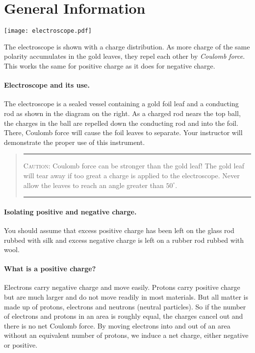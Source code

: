 \section{General Information}
\begin{marginfigure}%
	\texttt{[image: electroscope.pdf]}
	\caption{The electroscope is shown with a charge distribution.  As more charge of the same polarity accumulates in the gold leaves, they repel each other by \textit{Coulomb force}.  This works the same for positive charge as it does for negative charge.}
\end{marginfigure}
\paragraph{Electroscope and its use.} 
The electroscope is a sealed vessel containing a gold foil leaf and a conducting rod as shown in the diagram on the right.  As a charged rod nears the top ball, the charges in the ball are repelled down the conducting rod and into the foil.  There, Coulomb force will cause the foil leaves to separate.  Your instructor will demonstrate the proper use of this instrument.

\clearpage
\begin{quote} \hrule 
\textsc{Caution:} Coulomb force can be stronger than the gold leaf!  The gold leaf will tear away if too great a charge is applied to the electroscope.  Never allow the leaves to reach an angle greater than $50^{\circ}$.
\vspace{7pt}
\hrule 
\end{quote}
\paragraph{Isolating positive and negative charge.}  You should assume that excess positive charge has been left on the glass rod rubbed with silk and excess negative charge is left on a rubber rod rubbed with wool.

\paragraph{What is a positive charge?}  Electrons carry negative charge and move easily.  Protons carry positive charge but are much larger and do not move readily in most materials.  But all matter is made up of protons, electrons and neutrons (neutral particles).  So if the number of electrons and protons in an area is roughly equal, the charges cancel out and there is no net Coulomb force.  By moving electrons into and out of an area without an equivalent number of protons, we induce a net charge, either negative or positive.  

